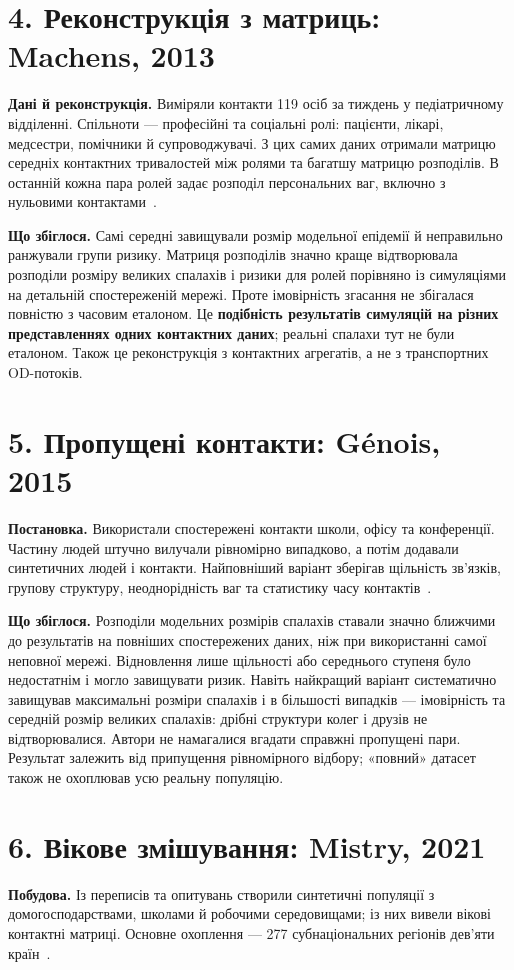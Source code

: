 \documentclass[11pt,a4paper]{article}
\begin{document}
\section*{4. Реконструкція з матриць: Machens, 2013}
\textbf{Дані й реконструкція.} Виміряли контакти 119 осіб за тиждень у педіатричному відділенні. Спільноти --- професійні та соціальні ролі: пацієнти, лікарі, медсестри, помічники й супроводжувачі. З цих самих даних отримали матрицю середніх контактних тривалостей між ролями та багатшу матрицю розподілів. В останній кожна пара ролей задає розподіл персональних ваг, включно з нульовими контактами~\cite{machens}.

\textbf{Що збіглося.} Самі середні завищували розмір модельної епідемії й неправильно ранжували групи ризику. Матриця розподілів значно краще відтворювала розподіли розміру великих спалахів і ризики для ролей порівняно із симуляціями на детальній спостереженій мережі. Проте імовірність згасання не збігалася повністю з часовим еталоном. Це \textbf{подібність результатів симуляцій на різних представленнях одних контактних даних}; реальні спалахи тут не були еталоном. Також це реконструкція з контактних агрегатів, а не з транспортних OD-потоків.

\section*{5. Пропущені контакти: Génois, 2015}
\textbf{Постановка.} Використали спостережені контакти школи, офісу та конференції. Частину людей штучно вилучали рівномірно випадково, а потім додавали синтетичних людей і контакти. Найповніший варіант зберігав щільність зв'язків, групову структуру, неоднорідність ваг та статистику часу контактів~\cite{genois}.

\textbf{Що збіглося.} Розподіли модельних розмірів спалахів ставали значно ближчими до результатів на повніших спостережених даних, ніж при використанні самої неповної мережі. Відновлення лише щільності або середнього ступеня було недостатнім і могло завищувати ризик. Навіть найкращий варіант систематично завищував максимальні розміри спалахів і в більшості випадків --- імовірність та середній розмір великих спалахів: дрібні структури колег і друзів не відтворювалися. Автори не намагалися вгадати справжні пропущені пари. Результат залежить від припущення рівномірного відбору; «повний» датасет також не охоплював усю реальну популяцію.

\section*{6. Вікове змішування: Mistry, 2021}
\textbf{Побудова.} Із переписів та опитувань створили синтетичні популяції з домогосподарствами, школами й робочими середовищами; із них вивели вікові контактні матриці. Основне охоплення --- 277 субнаціональних регіонів дев'яти країн~\cite{mistry}.
\end{document}

